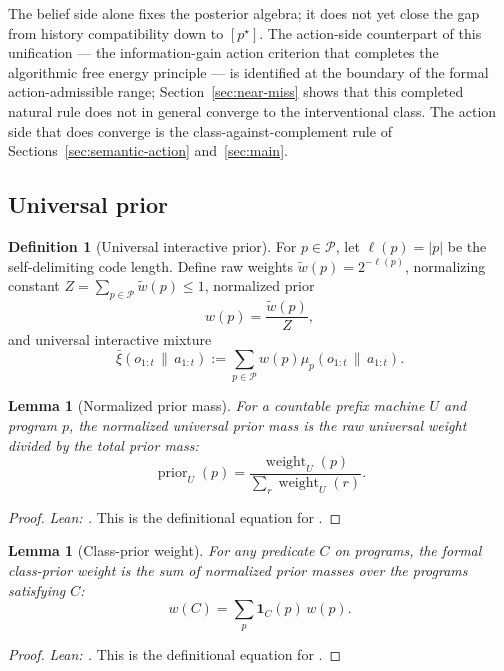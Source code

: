 \documentclass[11pt]{article}
\newtheorem{lemma}[theorem]{Lemma}
\theoremstyle{definition}
\newtheorem{definition}[theorem]{Definition}
\theoremstyle{remark}
\theoremstyle{plain}
\theoremstyle{definition}
\newcommand{\Pcal}{\mathcal{P}}
\newcommand{\givena}{\,\|\,}
\newcommand{\ellp}{\ell}
\newcommand{\wt}{\widetilde}
\newcommand{\barxi}{\bar{\xi}}
\begin{document}
The belief side alone fixes the posterior algebra; it does not yet close the gap from history compatibility down to $[p^\star]$. The action-side counterpart of this unification --- the information-gain action criterion that completes the algorithmic free energy principle --- is identified at the boundary of the formal action-admissible range; Section~\ref{sec:near-miss} shows that this completed natural rule does not in general converge to the interventional class. The action side that does converge is the class-against-complement rule of Sections~\ref{sec:semantic-action} and~\ref{sec:main}.

\subsection{Universal prior}

\begin{definition}[Universal interactive prior]
\label{def:universal-prior}
For $p\in\Pcal$, let $\ellp(p)=|p|$ be the self-delimiting code length. Define raw weights $\wt w(p)=2^{-\ellp(p)}$, normalizing constant $Z=\sum_{p\in\Pcal}\wt w(p)\le 1$, normalized prior
\[
w(p)=\frac{\wt w(p)}{Z},
\]
and universal interactive mixture
\[
\barxi(o_{1:t}\givena a_{1:t})
:=
\sum_{p\in\Pcal} w(p)\mu_p(o_{1:t}\givena a_{1:t}).
\]
\end{definition}

\begin{lemma}[Normalized prior mass]
\label{lem:prior-invariance}
For a countable prefix machine $U$ and program $p$, the normalized universal prior mass is the raw universal weight divided by the total prior mass:
\[
\operatorname{prior}_U(p)
=
\frac{\operatorname{weight}_U(p)}
{\sum_r \operatorname{weight}_U(r)}.
\]
\end{lemma}

\begin{proof}
\noindent\emph{Lean: .}
This is the definitional equation for .
\end{proof}

\begin{lemma}[Class-prior weight]
\label{lem:prior-necessity}
For any predicate $C$ on programs, the formal class-prior weight is the sum of normalized prior masses over the programs satisfying $C$:
\[
w(C)=\sum_p \mathbf 1_C(p)\,w(p).
\]
\end{lemma}

\begin{proof}
\noindent\emph{Lean: .}
This is the definitional equation for .
\end{proof}
\end{document}
